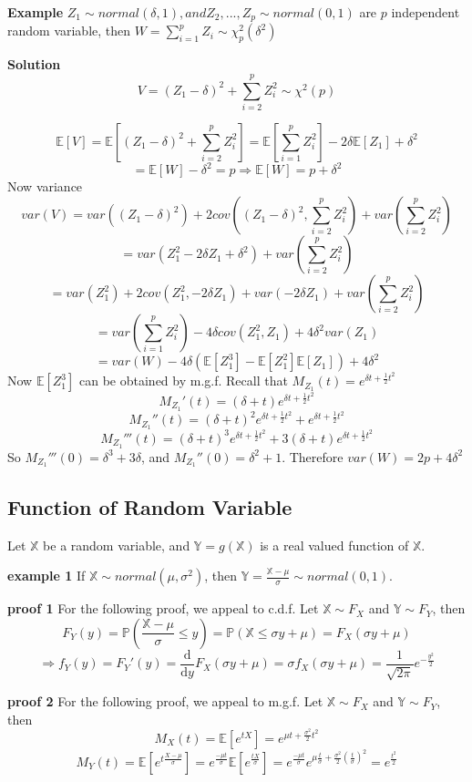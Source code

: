 \documentclass[a4paper,12pt]{article}
\begin{document}
\textbf{Example} $Z_1 \sim normal(\delta, 1), and Z_2, ..., Z_p \sim normal(0, 1)$ are $p$ independent random variable, then $W = \sum_{i=1}^p Z_i \sim \chi^2_p(\delta^2)$

\textbf{Solution}
$$V = (Z_1 - \delta)^2 + \sum_{i=2}^p Z_i^2 \sim \chi^2(p)$$

$$\mathbb{E}[V] = \mathbb{E}[ (Z_1 - \delta)^2 + \sum_{i=2}^p Z_i^2 ] = \mathbb{E}[\sum_{i=1}^p Z_i^2] - 2\delta\mathbb{E}[Z_1] + \delta^2$$
$$= \mathbb{E}[W] - \delta^2 = p \Rightarrow \mathbb{E}[W] = p + \delta^2$$
Now variance
$$var(V) = var( (Z_1-\delta)^2 ) + 2cov( (Z_1-\delta)^2, \sum_{i=2}^p Z_i^2 ) + var( \sum_{i=2}^p Z_i^2 )$$
$$= var(Z_1^2 -2\delta Z_1 + \delta^2) + var( \sum_{i=2}^p Z_i^2 )$$
$$= var(Z_1^2)+2cov(Z_1^2, -2\delta Z_1)+var(-2\delta Z_1) + var( \sum_{i=2}^p Z_i^2 )$$
$$= var(\sum_{i=1}^p Z_i^2) -4\delta cov(Z_1^2, Z_1) + 4\delta^2 var(Z_1)$$
$$= var(W) -4\delta(\mathbb{E}[Z_1^3]-\mathbb{E}[Z_1^2]\mathbb{E}[Z_1])+4\delta^2$$
Now $\mathbb{E}[Z_1^3]$ can be obtained by m.g.f. Recall that $M_{Z_1}(t) = e^{\delta t + \frac{1}{2}t^2}$
$$M_{Z_1}'(t) = (\delta+t)e^{\delta t + \frac{1}{2}t^2}$$
$$M_{Z_1}''(t) = (\delta+t)^2e^{\delta t + \frac{1}{2}t^2}+e^{\delta t + \frac{1}{2}t^2}$$
$$M_{Z_1}'''(t) = (\delta+t)^3e^{\delta t + \frac{1}{2}t^2}+3(\delta+t)e^{\delta t + \frac{1}{2}t^2}$$
So $M_{Z_1}'''(0) = \delta^3+3\delta$, and $M_{Z_1}''(0) = \delta^2 + 1$. Therefore $var(W) = 2p+4\delta^2$
\subsection{Function of Random Variable}
Let $\mathbb{X}$ be a random variable, and $\mathbb{Y} = g(\mathbb{X})$ is a real valued function of $\mathbb{X}$. 

\textbf{example 1}
If $\mathbb{X} \sim normal(\mu, \sigma^2)$, then $\mathbb{Y} = \frac{\mathbb{X}-\mu}{\sigma} \sim normal(0, 1)$. 

\textbf{proof 1} For the following proof, we appeal to c.d.f. Let $\mathbb{X} \sim F_X$ and $\mathbb{Y} \sim F_Y$, then
$$F_Y(y) = \mathbb{P}( \frac{\mathbb{X}-\mu}{\sigma} \leq y ) = \mathbb{P}( \mathbb{X} \leq \sigma y + \mu ) = F_X( \sigma y + \mu )$$
$$\Rightarrow f_Y(y) = F_Y'(y) = \frac{\mathrm{d}}{\mathrm{d}y}F_X( \sigma y + \mu ) = \sigma f_X(  \sigma y + \mu ) = \frac{1}{\sqrt{2\pi}}e^{-\frac{y^2}{2}}$$

\textbf{proof 2} For the following proof, we appeal to m.g.f. Let $\mathbb{X} \sim F_X$ and $\mathbb{Y} \sim F_Y$, then
$$M_X(t) = \mathbb{E}[e^{tX}] = e^{\mu t + \frac{\sigma^2}{2}t^2}$$
$$M_Y(t) = \mathbb{E}[e^{t\frac{X-\mu}{\sigma}}] = e^\frac{-\mu t}{\sigma} \mathbb{E}[ e^\frac{tX}{\sigma}] = 
e^\frac{-\mu t}{\sigma}e^{\mu \frac{t}{\sigma} + \frac{\sigma^2}{2}(\frac{t}{\sigma})^2} = e^\frac{t^2}{2}$$
\end{document}
